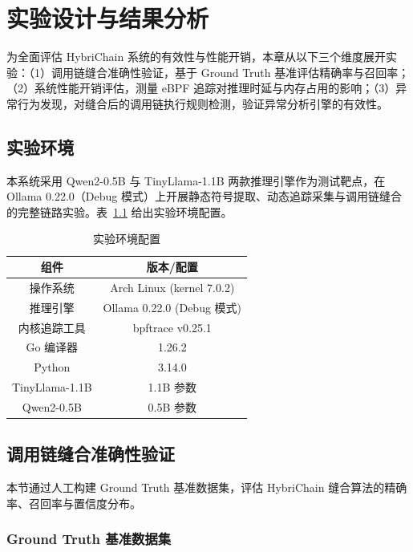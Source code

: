
\chapter{实验设计与结果分析}
\label{chap:experiment}

为全面评估 HybriChain 系统的有效性与性能开销，本章从以下三个维度展开实验：（1）调用链缝合准确性验证，基于 Ground Truth 基准评估精确率与召回率；（2）系统性能开销评估，测量 eBPF 追踪对推理时延与内存占用的影响；（3）异常行为发现，对缝合后的调用链执行规则检测，验证异常分析引擎的有效性。

\section{实验环境}

本系统采用 Qwen2-0.5B 与 TinyLlama-1.1B 两款推理引擎作为测试靶点，在 Ollama 0.22.0（Debug 模式）上开展静态符号提取、动态追踪采集与调用链缝合的完整链路实验。表~\ref{tab:env} 给出实验环境配置。

\begin{table}[H]
    \centering
    \caption{实验环境配置}
    \label{tab:env}
    \begin{tabular}{|c|c|}
        \hline
        \textbf{组件} & \textbf{版本/配置} \\
        \hline
        操作系统 & Arch Linux (kernel 7.0.2) \\
        \hline
        推理引擎 & Ollama 0.22.0 (Debug 模式) \\
        \hline
        内核追踪工具 & bpftrace v0.25.1 \\
        \hline
        Go 编译器 & 1.26.2 \\
        \hline
        Python & 3.14.0 \\
        \hline
        TinyLlama-1.1B & 1.1B 参数 \\
        \hline
        Qwen2-0.5B & 0.5B 参数 \\
        \hline
    \end{tabular}
\end{table}

\section{调用链缝合准确性验证}

本节通过人工构建 Ground Truth 基准数据集，评估 HybriChain 缝合算法的精确率、召回率与置信度分布。

\subsection{Ground Truth 基准数据集}

